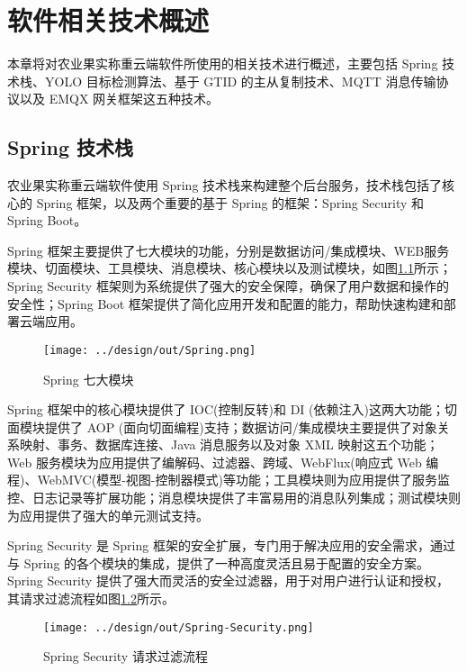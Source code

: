 \chapter{软件相关技术概述}

本章将对农业果实称重云端软件所使用的相关技术进行概述，主要包括 Spring 技术栈、YOLO 目标检测算法、基于 GTID 的主从复制技术、MQTT 消息传输协议以及 EMQX 网关框架这五种技术。

\section{Spring 技术栈}\label{sec:spring}

农业果实称重云端软件使用 Spring 技术栈来构建整个后台服务，技术栈包括了核心的 Spring 框架，以及两个重要的基于 Spring 的框架：Spring Security 和 Spring Boot。

Spring 框架主要提供了七大模块的功能，分别是数据访问/集成模块、WEB服务模块、切面模块、工具模块、消息模块、核心模块以及测试模块，如图\ref{fig:Spring}所示；Spring Security 框架则为系统提供了强大的安全保障，确保了用户数据和操作的安全性；Spring Boot 框架提供了简化应用开发和配置的能力，帮助快速构建和部署云端应用。

\begin{figure}[H]
    \centering
    \texttt{[image: ../design/out/Spring.png]}
    \caption{Spring 七大模块}
    \label{fig:Spring}
\end{figure}

Spring 框架中的核心模块提供了 IOC(控制反转)和 DI (依赖注入)这两大功能；切面模块提供了 AOP (面向切面编程)支持；数据访问/集成模块主要提供了对象关系映射、事务、数据库连接、Java 消息服务以及对象 XML 映射这五个功能；Web 服务模块为应用提供了编解码、过滤器、跨域、WebFlux(响应式 Web 编程)、WebMVC(模型-视图-控制器模式)等功能；工具模块则为应用提供了服务监控、日志记录等扩展功能；消息模块提供了丰富易用的消息队列集成；测试模块则为应用提供了强大的单元测试支持\cite{Spring-框架概述}。

Spring Security 是 Spring 框架的安全扩展，专门用于解决应用的安全需求，通过与 Spring 的各个模块的集成，提供了一种高度灵活且易于配置的安全方案。Spring Security 提供了强大而灵活的安全过滤器，用于对用户进行认证和授权，其请求过滤流程如图\ref{fig:Spring-Security}所示。

\begin{figure}[H]
    \centering
    \texttt{[image: ../design/out/Spring-Security.png]}
    \caption{Spring Security 请求过滤流程}
    \label{fig:Spring-Security}
\end{figure}


